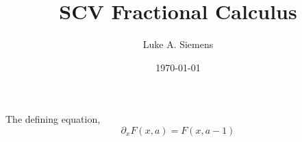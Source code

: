 \documentclass[%
 onecolumn,
 amsmath, amssymb, aps, pra, 10pt
]{revtex4-2}
\begin{document}
\title{SCV Fractional Calculus}%
\author{Luke A. Siemens}
\noaffiliation
\date{\today}
\maketitle

The defining equation,
\begin{equation}
\partial_x F(x, a) = F(x, a - 1)
\label{SCV_condition}
\end{equation}



\end{document}
